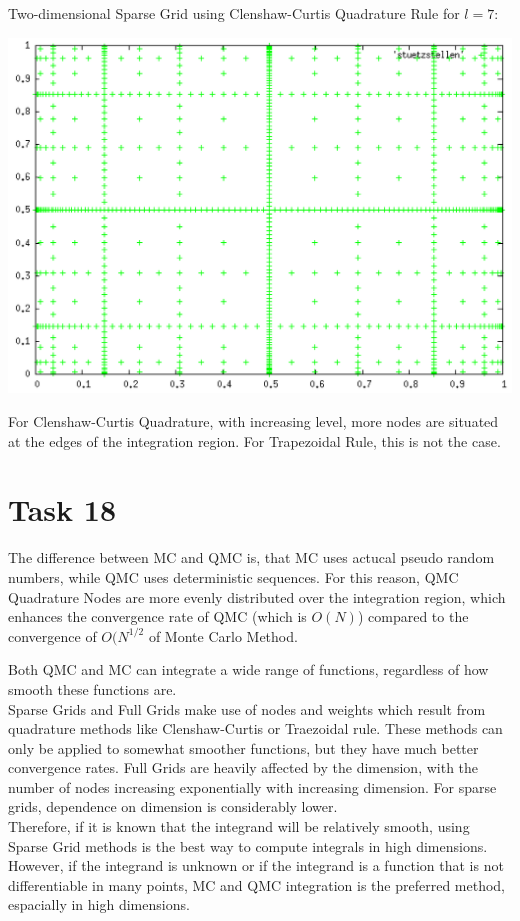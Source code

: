 \documentclass[10pt,a4paper]{article}
\begin{document}
Two-dimensional Sparse Grid using Clenshaw-Curtis Quadrature Rule for $l=7$:
\begin{center}
\includegraphics[scale=0.5]{clenshaw_curtis_l7.png}	
\end{center}
For Clenshaw-Curtis Quadrature, with increasing level, more nodes are situated at the edges of the integration region. For Trapezoidal Rule, this is not the case.



\section*{Task 18}

The difference between MC and QMC is, that MC uses actucal pseudo random numbers, while QMC uses deterministic sequences. For this reason, QMC Quadrature Nodes are more evenly distributed over the integration region, which enhances the convergence rate of QMC (which is $O(N)$) compared to the convergence of $O(N^{1/2}$ of Monte Carlo Method.

Both QMC and MC can integrate a wide range of functions, regardless of how smooth these functions are. \\

Sparse Grids and Full Grids make use of nodes and weights which result from quadrature methods like Clenshaw-Curtis or Traezoidal rule. These methods can only be applied to somewhat smoother functions, but they have much better convergence rates. 
Full Grids are heavily affected by the dimension, with the number of nodes increasing exponentially with increasing dimension. For sparse grids, dependence on dimension is considerably lower. \\

Therefore, if it is known that the integrand will be relatively smooth, using Sparse Grid methods is the best way to compute integrals in high dimensions. However, if the integrand is unknown or if the integrand is a function that is not differentiable in many points, MC and QMC integration is the preferred method, espacially in high dimensions.
\end{document}
